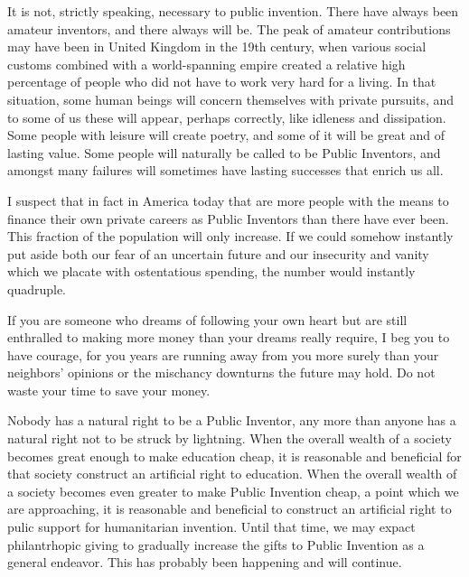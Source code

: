 \documentclass[
	fontsize=10pt, %
	twoside=false, %
	secnumdepth=1, %
]{kaobook}
\begin{document}
It is not, strictly speaking, necessary to public invention.
There have always been amateur inventors, and there always will be.
The peak of amateur contributions may have been in United Kingdom in the
19th century, when various social customs combined with a world-spanning
empire created a relative high percentage of people who did not have
to work very hard for a living. In that situation, some human beings
will concern themselves with private pursuits, and to some of us
these will appear, perhaps correctly, like idleness and dissipation.
Some people with leisure will create poetry,
and some of it will be great and of lasting value.
Some people will naturally be called to be Public Inventors, and
amongst many failures will sometimes have lasting successes
that enrich us all.

I suspect that in fact in America today that are more people
with the means to finance their own private careers as Public Inventors
than there have ever been. This fraction of the population will
only increase. If we could somehow instantly put aside both our
fear of an uncertain future and our insecurity and vanity which
we placate with ostentatious spending, the number would instantly
quadruple.

If you are someone who dreams of following your own heart but
are still enthralled to making more money than your dreams really
require, I beg you to have courage, for you years are running
away from you more surely than your neighbors' opinions or the
mischancy downturns the future may hold. Do not waste your
time to save your money.

Nobody has a natural right to be a Public Inventor, any more than
anyone has a natural right not to be struck by lightning.
When the overall wealth of a society becomes great enough to make
education cheap, it is reasonable and beneficial for that society construct an
artificial right to education. When the overall wealth of a society
becomes even greater to make Public Invention cheap, a point which
we are approaching, it is reasonable and beneficial to construct
an artificial right to pulic support for humanitarian invention.
Until that time, we may expact philantrhopic giving to gradually
increase the gifts to Public Invention as a general endeavor.
This has probably been happening and will continue.
\end{document}

